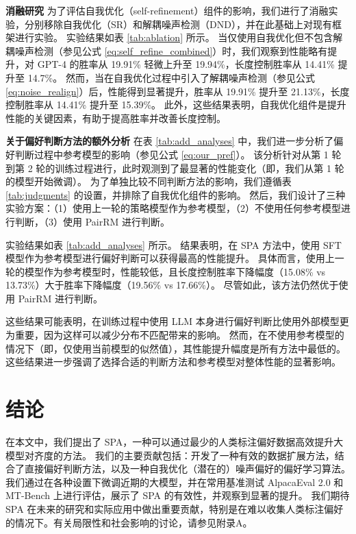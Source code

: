 \textbf{消融研究} 
为了评估自我优化（self-refinement）组件的影响，我们进行了消融实验，分别移除自我优化（SR）和解耦噪声检测（DND），并在此基础上对现有框架进行实验。
实验结果如表 \ref{tab:ablation} 所示。
当仅使用自我优化但不包含解耦噪声检测（参见公式 \ref{eq:self_refine_combined}）时，我们观察到性能略有提升，对 GPT-4 的胜率从 19.91\% 轻微上升至 19.94\%，长度控制胜率从 14.41\% 提升至 14.7\%。
然而，当在自我优化过程中引入了解耦噪声检测（参见公式 \ref{eq:noise_realign}）后，性能得到显著提升，胜率从 19.91\% 提升至 21.13\%，长度控制胜率从 14.41\% 提升至 15.39\%。
此外，这些结果表明，自我优化组件是提升性能的关键因素，有助于提高胜率并改善长度控制。

\textbf{关于偏好判断方法的额外分析}  
在表 \ref{tab:add_analyses} 中，我们进一步分析了偏好判断过程中参考模型的影响（参见公式 \ref{eq:our_pref}）。
该分析针对从第 1 轮到第 2 轮的训练过程进行，此时观测到了最显著的性能变化（即，我们从第 1 轮的模型开始微调）。
为了单独比较不同判断方法的影响，我们遵循表 \ref{tab:judgments} 的设置，并排除了自我优化组件的影响。
然后，我们设计了三种实验方案：（1）使用上一轮的策略模型作为参考模型，（2）不使用任何参考模型进行判断，（3）使用 PairRM 进行判断。

实验结果如表 \ref{tab:add_analyses} 所示。
结果表明，在 SPA 方法中，使用 SFT 模型作为参考模型进行偏好判断可以获得最高的性能提升。
具体而言，使用上一轮的模型作为参考模型时，性能较低，且长度控制胜率下降幅度（15.08\% vs 13.73\%）大于胜率下降幅度（19.56\% vs 17.66\%）。
尽管如此，该方法仍然优于使用 PairRM 进行判断。

这些结果可能表明，在训练过程中使用 LLM 本身进行偏好判断比使用外部模型更为重要，因为这样可以减少分布不匹配带来的影响。
然而，在不使用参考模型的情况下（即，仅使用当前模型的似然值），其性能提升幅度是所有方法中最低的。
这些结果进一步强调了选择合适的判断方法和参考模型对整体性能的显著影响。

\section{结论}
在本文中，我们提出了 SPA，一种可以通过最少的人类标注偏好数据高效提升大模型对齐度的方法。
我们的主要贡献包括：开发了一种有效的数据扩展方法，结合了直接偏好判断方法，以及一种自我优化（潜在的）噪声偏好的偏好学习算法。
我们通过在各种设置下微调近期的大模型，并在常用基准测试 AlpacaEval 2.0 和 MT-Bench 上进行评估，展示了 SPA 的有效性，并观察到显著的提升。
我们期待 SPA 在未来的研究和实际应用中做出重要贡献，特别是在难以收集人类标注偏好的情况下。有关局限性和社会影响的讨论，请参见附录A。


\begingroup
    \printbibliography[title={外文翻译参考文献}]
\endgroup
